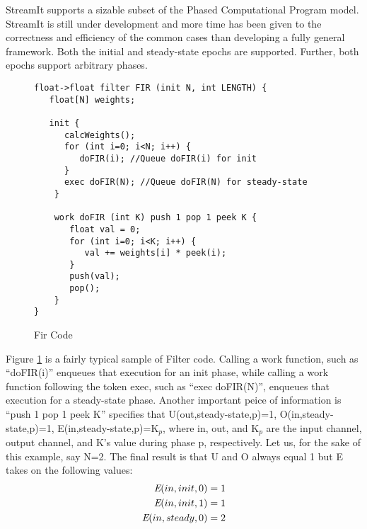 StreamIt supports a sizable subset of the Phased Computational Program model. StreamIt is still under development and more time has been given to the correctness and efficiency of the common cases than developing a fully general framework. Both the initial and steady-state epochs are supported. Further, both epochs support arbitrary phases.
\begin{figure}[t]
\begin{verbatim}
float->float filter FIR (init N, int LENGTH) {
   float[N] weights;

   init {
      calcWeights();
      for (int i=0; i<N; i++) {
         doFIR(i); //Queue doFIR(i) for init
      }
      exec doFIR(N); //Queue doFIR(N) for steady-state
    }

    work doFIR (int K) push 1 pop 1 peek K {
       float val = 0;
       for (int i=0; i<K; i++) {
          val += weights[i] * peek(i);
       }
       push(val);
       pop();
    }
}
\end{verbatim}
\caption{Fir Code
\protect\label{fig:fir}}
\end{figure}

Figure \ref{fig:fir} is a fairly typical sample of Filter code. Calling a work function, such as ``doFIR(i)'' enqueues that execution for an init phase, while calling a work function following the token exec, such as ``exec doFIR(N)'', enqueues that execution for a steady-state phase. Another important peice of information is ``push 1 pop 1 peek K'' specifies that U(out,steady-state,p)=1, O(in,steady-state,p)=1, E(in,steady-state,p)=K$_p$, where in, out, and K$_p$ are the input channel, output channel, and K's value during phase p, respectively. Let us, for the sake of this example, say N=2. The final result is that U and O always equal 1 but E takes on the following values:
\begin{align}
\mbox{\it E}(in,init,0)&=1\nonumber\\
\mbox{\it E}(in,init,1)&=1\nonumber\\
\mbox{\it E}(in,steady,0)&=2\nonumber
\end{align}

